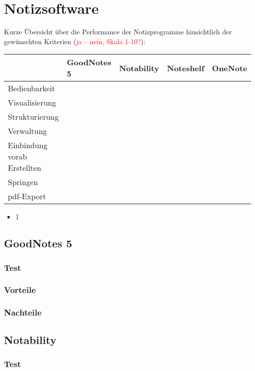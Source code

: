 \documentclass[parskip=off,index=totocnumbered]{scrreprt}
\begin{document}
\chapter{Notizsoftware}
Kurze Übersicht über die Performance der Notizprogramme hinsichtlich der gewünschten Kriterien (\textcolor{red}{ja -- nein, Skala 1-10?}):
\renewcommand*{\arraystretch}{1.2} 
\begin{longtable}{>{\centering \arraybackslash}p{3.2cm}>{\centering \arraybackslash}p{2.2cm}>{\centering \arraybackslash}p{2.2cm}>{\centering \arraybackslash}p{2.2cm}>{\centering \arraybackslash}p{2.2cm}} \toprule
& GoodNotes 5 & Notability & Noteshelf & OneNote \\  \midrule
Bedienbarkeit & & & & \\
Visualisierung & & & & \\
Strukturierung & & & & \\
Verwaltung & & & & \\
Einbindung vorab Erstellten & & & & \\
Springen & & & & \\
pdf-Export & & & & \\ \bottomrule
\end{longtable}

\begin{itemize}
   \item 1
\end{itemize}

\section{GoodNotes 5}
\subsection{Test}
\subsection{Vorteile}
\subsection{Nachteile}

\section{Notability}
\subsection{Test}
\end{document}
